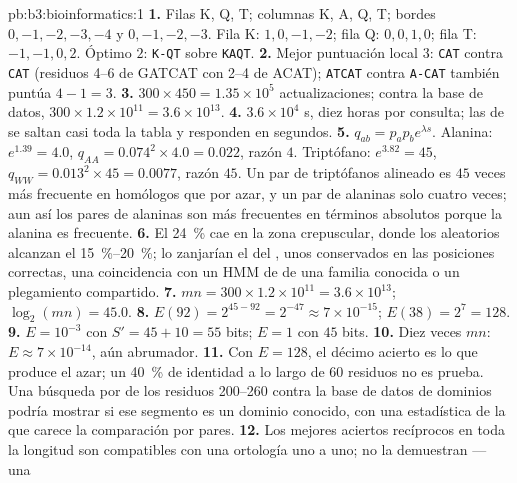 \begin{solution}{pb:b3:bioinformatics:1}
\textbf{1.} Filas K, Q, T; columnas K, A, Q, T; bordes $0,-1,-2,-3,-4$ y
$0,-1,-2,-3$. Fila K: $1, 0, -1, -2$; fila Q: $0, 0, 1, 0$; fila T:
$-1, -1, 0, 2$. Óptimo $2$: \texttt{K-QT} sobre \texttt{KAQT}.
\textbf{2.} Mejor puntuación local $3$: \texttt{CAT} contra \texttt{CAT}
(residuos 4--6 de GATCAT con 2--4 de ACAT); \texttt{ATCAT} contra
\texttt{A-CAT} también puntúa $4 - 1 = 3$.
\textbf{3.} $300\times 450 = 1.35\times 10^{5}$ actualizaciones; contra
la base de datos, $300\times 1.2\times 10^{11} = 3.6\times 10^{13}$.
\textbf{4.} $3.6\times 10^{4}$ s, diez horas por consulta; las 
de  se saltan casi toda la tabla y responden en segundos.
\textbf{5.} $q_{ab} = p_{a}p_{b}e^{\lambda s}$. Alanina: $e^{1.39} = 4.0$,
$q_{AA} = 0.074^{2}\times 4.0 = 0.022$, razón $4$. Triptófano:
$e^{3.82} = 45$, $q_{WW} = 0.013^{2}\times 45 = 0.0077$, razón $45$. Un
par de triptófanos alineado es $45$ veces más frecuente en homólogos que
por azar, y un par de alaninas solo cuatro veces; aun así los pares de
alaninas son más frecuentes en términos absolutos porque la alanina es
frecuente.
\textbf{6.} El \qty{24}{\%} cae en la zona crepuscular, donde los
 aleatorios alcanzan el \qtyrange{15}{20}{\%}; lo zanjarían
el  del , unos  conservados en las posiciones
correctas, una coincidencia con un HMM de  de una familia conocida
o un plegamiento compartido.
\textbf{7.} $mn = 300\times 1.2\times 10^{11} = 3.6\times 10^{13}$;
$\log_{2}(mn) = 45.0$.
\textbf{8.} $E(92) = 2^{45 - 92} = 2^{-47} \approx 7\times 10^{-15}$;
$E(38) = 2^{7} = 128$.
\textbf{9.} $E = 10^{-3}$ con $S' = 45 + 10 = 55$ bits; $E = 1$ con $45$
bits.
\textbf{10.} Diez veces $mn$: $E \approx 7\times 10^{-14}$, aún
abrumador.
\textbf{11.} Con $E = 128$, el décimo acierto es lo que produce el azar;
un \qty{40}{\%} de identidad a lo largo de $60$ residuos no es prueba.
Una búsqueda por  de los residuos 200--260 contra la base de datos
de dominios podría mostrar si ese segmento es un dominio conocido, con
una estadística de la que carece la comparación por pares.
\textbf{12.} Los mejores aciertos recíprocos en toda la longitud son
compatibles con una ortología uno a uno; no la demuestran --- una

\end{solution}
